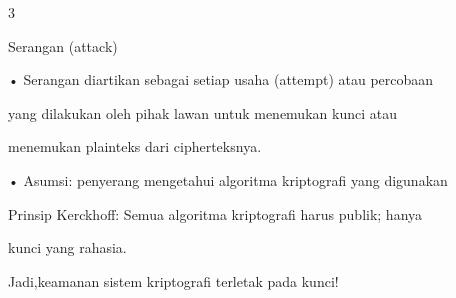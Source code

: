 \documentclass{article}
\begin{document}

3

Serangan (attack) 

• Serangan diartikan sebagai setiap usaha (attempt) atau percobaan 

yang dilakukan oleh pihak lawan untuk menemukan kunci atau 

menemukan plainteks dari cipherteksnya.

• Asumsi: penyerang mengetahui algoritma kriptografi yang digunakan

 Prinsip Kerckhoff: Semua algoritma kriptografi harus publik; hanya 

kunci yang rahasia.

 Jadi,keamanan sistem kriptografi terletak pada kunci!
\end{document}
